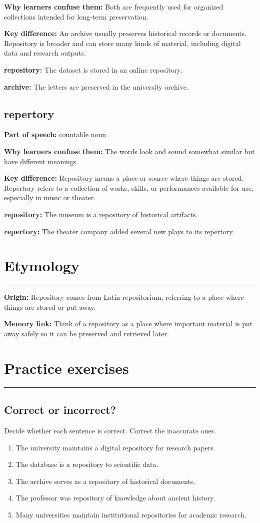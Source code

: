 \documentclass[11pt]{article}
\newcommand{\sectionrule}{\par\vspace{-0.5em}\noindent\textcolor{Accent}{\rule{\linewidth}{0.6pt}}\par}
\begin{document}
\textbf{Why learners confuse them:} Both are frequently used for organized collections intended for long-term preservation.

\textbf{Key difference:} An archive usually preserves historical records or documents. Repository is broader and can store many kinds of material, including digital data and research outputs.

\textbf{repository:} The dataset is stored in an online repository.

\textbf{archive:} The letters are preserved in the university archive.

\subsection{repertory}
\textbf{Part of speech:} countable noun

\textbf{Why learners confuse them:} The words look and sound somewhat similar but have different meanings.

\textbf{Key difference:} Repository means a place or source where things are stored. Repertory refers to a collection of works, skills, or performances available for use, especially in music or theater.

\textbf{repository:} The museum is a repository of historical artifacts.

\textbf{repertory:} The theater company added several new plays to its repertory.

\section{Etymology}
\sectionrule
\textbf{Origin:} Repository comes from Latin repositorium, referring to a place where things are stored or put away.

\textbf{Memory link:} Think of a repository as a place where important material is put away safely so it can be preserved and retrieved later.

\section{Practice exercises}
\sectionrule
\subsection{Correct or incorrect?}
Decide whether each sentence is correct. Correct the inaccurate ones.

\begin{enumerate}
  \item The university maintains a digital repository for research papers.
  \item The database is a repository to scientific data.
  \item The archive serves as a repository of historical documents.
  \item The professor was repository of knowledge about ancient history.
  \item Many universities maintain institutional repositories for academic research.
\end{enumerate}
\end{document}
